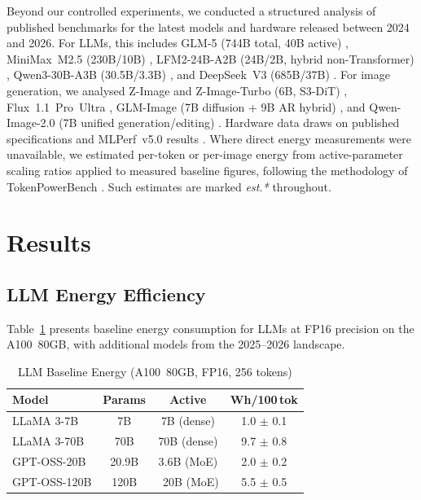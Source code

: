 \documentclass[AMS,STIX2COL]{WileyNJD-v2}
\begin{document}
Beyond our controlled experiments, we conducted a structured analysis of published benchmarks for the latest models and hardware released between 2024 and 2026. For LLMs, this includes GLM-5 (744B total, 40B active) \cite{zhipu2026glm5}, MiniMax~M2.5 (230B/10B) \cite{minimax2026m25}, LFM2-24B-A2B (24B/2B, hybrid non-Transformer) \cite{liquid2025lfm2}, Qwen3-30B-A3B (30.5B/3.3B) \cite{alibaba2025qwen3}, and DeepSeek~V3 (685B/37B) \cite{deepseek2024v3}. For image generation, we analysed Z-Image and Z-Image-Turbo (6B, S3-DiT) \cite{tongyi2025zimage}, Flux~1.1~Pro~Ultra \cite{bfl2024fluxultra}, GLM-Image (7B diffusion + 9B AR hybrid) \cite{zhipu2025glmimage}, and Qwen-Image-2.0 (7B unified generation/editing) \cite{wu2025qwenimage}. Hardware data draws on published specifications and MLPerf~v5.0 results \cite{google2025ironwood, nvidia2024b200, nvidia2025gb300, cerebras2024cs3, amd2024mi325x, mlperf2025inference}. Where direct energy measurements were unavailable, we estimated per-token or per-image energy from active-parameter scaling ratios applied to measured baseline figures, following the methodology of TokenPowerBench \cite{niu2025tokenpowerbench}. Such estimates are marked \textit{est.*} throughout.


\section{Results}\label{sec4}

\subsection{LLM Energy Efficiency}

Table~\ref{tab:llm_baseline} presents baseline energy consumption for LLMs at FP16 precision on the A100~80GB, with additional models from the 2025--2026 landscape.

\begin{table}[h]
\caption{LLM Baseline Energy (A100~80GB, FP16, 256 tokens)}\label{tab:llm_baseline}
\centering
\begin{tabular}{lccc}
\toprule
\textbf{Model} & \textbf{Params} & \textbf{Active} & \textbf{Wh/100\,tok} \\
\midrule
LLaMA 3-7B   & 7B     & 7B (dense)    & 1.0 $\pm$ 0.1 \\
LLaMA 3-70B  & 70B    & 70B (dense)   & 9.7 $\pm$ 0.8 \\
GPT-OSS-20B  & 20.9B  & 3.6B (MoE)    & 2.0 $\pm$ 0.2 \\
GPT-OSS-120B & 120B   & ~20B (MoE)    & 5.5 $\pm$ 0.5 \\
\bottomrule
\end{tabular}
\end{table}
\end{document}
